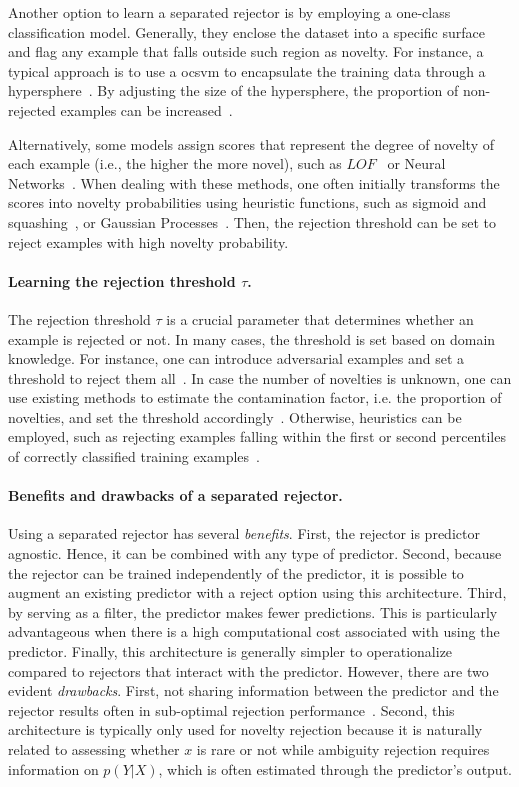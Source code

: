 Another option to learn a separated rejector is by employing a one-class classification model. Generally, they enclose the dataset into a specific surface and flag any example that falls outside such region as novelty. For instance, a typical approach is to use a \gls{ocsvm} to encapsulate the training data through a hypersphere~\citep{Coenen2020,Homenda2014}. By adjusting the size of the hypersphere, the proportion of non-rejected examples can be increased~\citep{Wu2007}. 

Alternatively, some models assign scores that represent the degree of novelty of each example (i.e., the higher the more novel), such as $LOF$~\citep{VanderPlas2023} or Neural Networks~\citep{Hsu2020}. When dealing with these methods, one often initially transforms the scores into novelty probabilities using heuristic functions, such as sigmoid and squashing~\citep{Vercruyssen2018}, or Gaussian Processes~\citep{Martens}. Then, the rejection threshold can be set to reject examples with high novelty probability.

\paragraph{\textbf{Learning the rejection threshold $\tau$.}} The rejection threshold $\tau$ is a crucial parameter that determines whether an example is rejected or not. In many cases, the threshold is set based on domain knowledge. For instance, one can introduce adversarial examples and set a threshold to reject them all~\citep{Hosseini2017}. In case the number of novelties is unknown, one can use existing methods to estimate the contamination factor, i.e. the proportion of novelties, and set the threshold accordingly~\citep{Perini2022,Perini2022a}. Otherwise, heuristics can be employed, such as rejecting examples falling within the first or second percentiles of correctly classified training examples~\citep{Wang2020}. 

\paragraph{\bf{Benefits and drawbacks of a separated rejector.}} Using a separated rejector has several \emph{benefits}. First, the rejector is predictor agnostic. Hence, it can be combined with any type of predictor. Second, because the rejector can be trained independently of the predictor, it is possible to augment an existing predictor with a reject option using this architecture. 
Third, by serving as a filter, the predictor makes fewer predictions. This is particularly advantageous when there is a high computational cost associated with using the predictor.
Finally, this architecture is generally simpler to operationalize compared to rejectors that interact with the predictor.
However, there are two evident \emph{drawbacks}. First, not sharing information between the predictor and the rejector results often in sub-optimal rejection performance~\citep{Homenda2014}. 
Second, this architecture is typically only used for novelty rejection because it is naturally related to assessing whether $x$ is rare or not while ambiguity rejection requires information on $p(Y|X)$, which is often estimated through the predictor's output.

